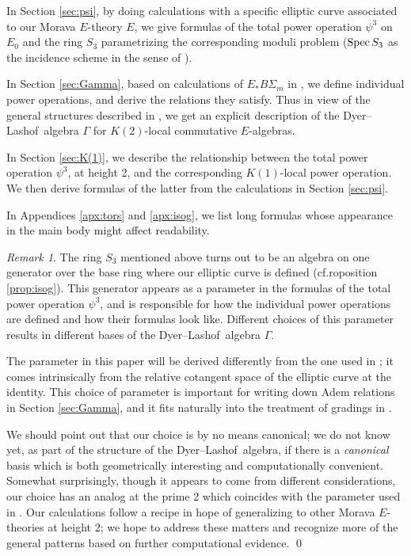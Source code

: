 \documentclass{gtpart}
\theoremstyle{definition}
\theoremstyle{remark}
\newtheorem{rmk}[thm]{Remark}
\newcommand{\Spec}{{\rm Spec\thinspace}}
\newcommand{\DL}{Dyer--Lashof~}
\newcommand{\p}{\psi^3}
\newcommand{\G}{\Gamma}
\begin{document}
In Section \ref{sec:psi}, by doing calculations with a specific elliptic curve associated to our Morava $E$-theory $E$, 
we give formulas of the total power operation $\p$ on $E_0$ and the ring $S_3$ parametrizing the corresponding moduli problem 
($\Spec S_3$ as the incidence scheme in the sense of \cite{katzmazur}).  

In Section \ref{sec:Gamma}, based on calculations of $E_* B\Sigma_m$ in \cite{Str98}, 
we define individual power operations, and derive the relations they satisfy.  
Thus in view of the general structures described in \cite{cong}, 
we get an explicit description of the \DL algebra $\G$ for $K(2)$-local commutative $E$-algebras.  

In Section \ref{sec:K(1)}, we describe the relationship between the total power operation $\p$, at height 2, and the corresponding $K(1)$-local power operation.  
We then derive formulas of the latter from the calculations in Section \ref{sec:psi}.  

In Appendices \ref{apx:tors} and \ref{apx:isog}, we list long formulas whose appearance in the main body might affect readability.  

\begin{rmk}
 The ring $S_3$ mentioned above turns out to be an algebra on one generator over the base ring where our elliptic curve is defined 
 (cf.roposition \ref{prop:isog}).  This generator appears as a parameter in the formulas of the total power operation $\p$, 
 and is responsible for how the individual power operations are defined and how their formulas look like.  
 Different choices of this parameter results in different bases of the \DL algebra $\G$.  

 The parameter in this paper will be derived differently from the one used in \cite{h2p2}; 
 it comes intrinsically from the relative cotangent space of the elliptic curve at the identity.  
 This choice of parameter is important for writing down Adem relations in Section \ref{sec:Gamma}, 
 and it fits naturally into the treatment of gradings in \cite{cong}.  

 We should point out that our choice is by no means canonical; 
 we do not know yet, as part of the structure of the \DL algebra, 
 if there is a {\em canonical} basis which is both geometrically interesting and computationally convenient.  
 Somewhat surprisingly, though it appears to come from different considerations, 
 our choice has an analog at the prime 2 which coincides with the parameter used in \cite{h2p2}.  
 Our calculations follow a recipe in hope of generalizing to other Morava $E$-theories at height 2; 
 we hope to address these matters and recognize more of the general patterns based on further computational evidence.  
\qed
\end{rmk}
\end{document}
